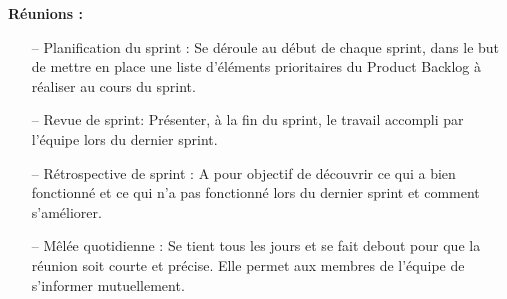 \begin{spacing}{1.2}
\textbf{Réunions : }
\begin{itemize}
\setlength\itemsep{0em}
\item[--] Planification du sprint : Se déroule au début de chaque sprint, dans le but de mettre en place une liste d'éléments prioritaires du Product Backlog à réaliser au cours du sprint.   
\item[--] Revue de sprint: Présenter, à la fin du sprint, le travail accompli par l’équipe lors du dernier sprint.
\item[--] Rétrospective de sprint : A pour objectif de découvrir ce qui a bien fonctionné et ce qui n'a pas fonctionné lors du dernier sprint et comment s'améliorer.
\item[--] Mêlée quotidienne : Se tient tous les jours et se fait debout pour que la réunion soit courte et précise. Elle permet aux membres de l’équipe de s'informer mutuellement.
\end{itemize}

\end{spacing}
